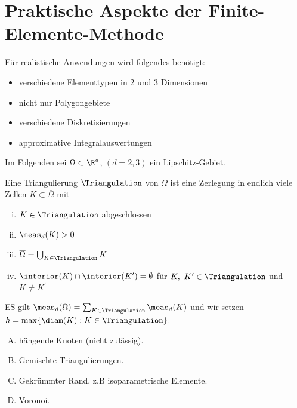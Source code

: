 \section{Praktische Aspekte der Finite-Elemente-Methode}

Für realistische Anwendungen wird folgendes benötigt:
\begin{itemize}
    \item
      verschiedene Elementtypen in 2 und 3 Dimensionen
    \item
      nicht nur Polygongebiete
    \item
      verschiedene Diskretisierungen
    \item
      approximative Integralauswertungen
\end{itemize}

Im Folgenden sei $\Omega \subset \R^d$, $(d = 2,3)$ ein Lipschitz-Gebiet.

\begin{Definition}
    \label{def:4.1}
    Eine Triangulierung $\Triangulation$ von $\Omega$ ist eine Zerlegung in endlich viele
    Zellen $K\subset \overline\Omega$ mit
    \begin{enumerate}[i)]
        \item
          $K\in \Triangulation$ abgeschlossen
        \item
          $\meas_d (K) > 0$
        \item
          $\overline\Omega = \bigcup_{K\in \Triangulation} K$
        \item
          $\interior(K) \cap\interior(K^\prime) = \emptyset$ für $K, \
          K^\prime \in \Triangulation$ und $K \neq K^\prime$
    \end{enumerate}
\end{Definition}


\begin{Bemerkung}
    ES gilt $\meas_d(\Omega) = \sum_{K\in \Triangulation} \meas_d(K)$ und wir setzen
    $h = \max\{\diam(K): K\in \Triangulation\}$.
\end{Bemerkung}


\begin{Beispiel}
    \begin{enumerate}[A)]
        \item
          hängende Knoten (nicht zulässig).
        \item
          Gemischte Triangulierungen.
        \item
          Gekrümmter Rand, z.B isoparametrische Elemente.
        \item
          Voronoi.
    \end{enumerate}
\end{Beispiel}


